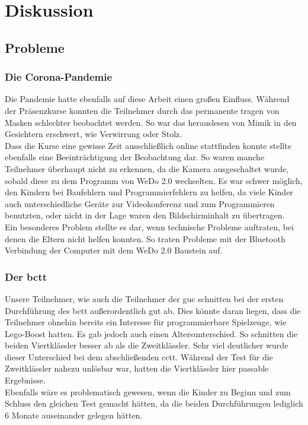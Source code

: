 \chapter{Diskussion}

\section{Probleme}
\subsection{Die Corona-Pandemie}
Die Pandemie hatte ebenfalls auf diese Arbeit einen großen Einfluss. Während der Präsenzkurse konnten die Teilnehmer durch das permanente tragen von Masken schlechter beobachtet werden. So war das herauslesen von Mimik in den Gesichtern erschwert, wie Verwirrung oder Stolz. \\
Dass die Kurse eine gewisse Zeit ausschließlich online stattfinden konnte stellte ebenfalls eine Beeinträchtigung der Beobachtung dar. So waren manche Teilnehmer überhaupt nicht zu erkennen, da die Kamera ausgeschaltet wurde, sobald diese zu dem Programm von WeDo 2.0 wechselten. Es war schwer möglich, den Kindern bei Baufehlern und Programmierfehlern zu helfen, da viele Kinder auch unterschiedliche Geräte zur Videokonferenz und zum Programmieren benutzten, oder nicht in der Lage waren den Bildschirminhalt zu übertragen.\\
Ein besonderes Problem stellte es dar, wenn technische Probleme auftraten, bei denen die Eltern nicht helfen konnten. So traten Probleme mit der Bluetooth Verbindung der Computer mit dem WeDo 2.0 Baustein auf.

\subsection{Der \acrlong{bctt}} \label{problemCTT}
Unsere Teilnehmer, wie auch die Teilnehmer der \acrlong{guc} schnitten bei der ersten Durchführung des \acrshort{bctt} außerordentlich gut ab. Dies könnte daran liegen, dass die Teilnehmer ohnehin bereits ein Interesse für programmierbare Spielzeuge, wie \gls{Lego}-Boost hatten. Es gab jedoch auch einen Altersunterschied. So schnitten die beiden Viertklässler besser ab als die Zweitklässler. Sehr viel deutlicher wurde dieser Unterschied bei dem abschließenden \acrshort{cctt}. Während der Test für die Zweitklässler nahezu unlösbar war, hatten die Viertklässler hier passable Ergebnisse.\\
Ebenfalls wäre es problematisch gewesen, wenn die Kinder zu Beginn und zum Schluss den gleichen Test gemacht hätten, da die beiden Durchführungen lediglich 6 Monate auseinander gelegen hätten.

